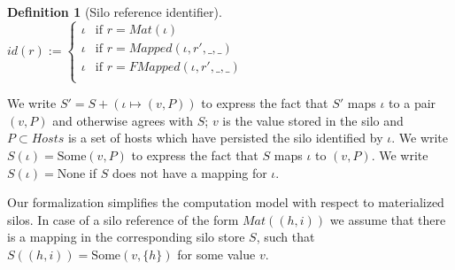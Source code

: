 \documentclass{article}
\theoremstyle{definition}
\newtheorem{defn}{Definition}[section]
\begin{document}
\begin{defn}[Silo reference identifier]
    $id(r) := \begin{cases}
    \iota  & \text{if } r = Mat(\iota) \\
    \iota  & \text{if } r = Mapped(\iota, r', \_, \_) \\
    \iota  & \text{if } r = FMapped(\iota, r', \_, \_) \\
    \end{cases}$
\end{defn}

\newpage

%
%


We write $S' = S + (\iota \mapsto (v, P))$ to express the fact that $S'$ maps $\iota$ to a pair $(v, P)$ and otherwise agrees with $S$; $v$ is the value stored in the silo and $P \subset Hosts$ is a set of hosts which have persisted the silo identified by $\iota$. We write $S(\iota) = \text{Some}(v, P)$ to express the fact that $S$ maps $\iota$ to $(v, P)$. We write $S(\iota) = \text{None}$ if $S$ does not have a mapping for $\iota$.

Our formalization simplifies the computation model with respect to materialized silos. In case of a silo reference of the form $Mat((h, i))$ we assume that there is a mapping in the corresponding silo store $S$, such that $S((h, i)) = \text{Some}(v, \{ h \})$ for some value $v$.

\end{document}
